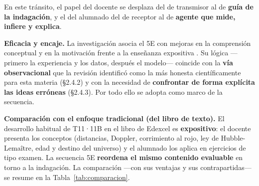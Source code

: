 En este tránsito, el papel del docente se desplaza del de transmisor al de \textbf{guía de la indagación}, y el del alumnado del de receptor al de \textbf{agente que mide, infiere y explica}.

\textbf{Eficacia y encaje.} La investigación asocia el 5E con mejoras en la comprensión conceptual y en la motivación frente a la enseñanza expositiva \parencite{bybee2006}. Su lógica ---primero la experiencia y los datos, después el modelo--- coincide con la \textbf{vía observacional} que la revisión identificó como la más honesta científicamente para esta materia (§2.4.2) y con la necesidad de \textbf{confrontar de forma explícita las ideas erróneas} (§2.4.3). Por todo ello se adopta como marco de la secuencia.

\textbf{Comparación con el enfoque tradicional (del libro de texto).} El desarrollo habitual de T11·11B en el libro de Edexcel es \textbf{expositivo}: el docente presenta los conceptos (distancias, Doppler, corrimiento al rojo, ley de Hubble-Lemaître, edad y destino del universo) y el alumnado los aplica en ejercicios de tipo examen. La secuencia 5E \textbf{reordena el mismo contenido evaluable} en torno a la indagación. La comparación ---con sus ventajas y sus contrapartidas--- se resume en la Tabla~\ref{tab:comparacion}.

